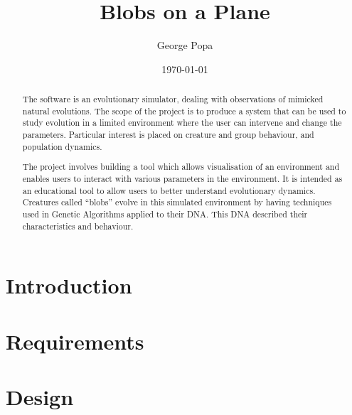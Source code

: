 \documentclass{l4proj}
\begin{document}
\title{Blobs on a Plane}

\author{George Popa}

\date{\today}
\maketitle
\begin{abstract}

The software is an evolutionary simulator, dealing with observations of mimicked natural evolutions. The scope of the project is to produce a system that can be used to study evolution in a limited environment where the user can intervene and change the parameters. Particular interest is placed on creature and group behaviour, and population dynamics.

The project involves building a tool which allows visualisation of an environment and enables users to interact with various parameters in the environment. It is intended as an educational tool to allow users to better understand evolutionary dynamics. Creatures called “blobs” evolve in this simulated environment by having techniques used in Genetic Algorithms applied to their DNA. This DNA described their characteristics and behaviour.


\end{abstract}

\tableofcontents


\chapter{Introduction}
\label{introduction}



\chapter{Requirements}
\label{requirements}



\chapter{Design}
\label{design}


\end{document}
